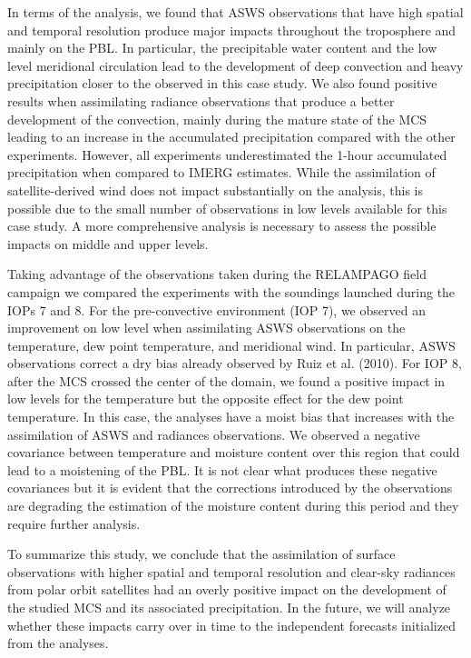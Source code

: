 \documentclass[final,5p,times,twocolumn,authoryear]{elsarticle} %
\begin{document}
In terms of the analysis, we found that ASWS observations that have high spatial and temporal resolution produce major impacts throughout the troposphere and mainly on the PBL. In particular, the precipitable water content and the low level meridional circulation lead to the development of deep convection and heavy precipitation closer to the observed in this case study. We also found positive results when assimilating radiance observations that produce a better development of the convection, mainly during the mature state of the MCS leading to an increase in the accumulated precipitation compared with the other experiments. However, all experiments underestimated the 1-hour accumulated precipitation when compared to IMERG estimates. While the assimilation of satellite-derived wind does not impact substantially on the analysis, this is possible due to the small number of observations in low levels available for this case study. A more comprehensive analysis is necessary to assess the possible impacts on middle and upper levels.

Taking advantage of the observations taken during the RELAMPAGO field campaign we compared the experiments with the soundings launched during the IOPs 7 and 8. For the pre-convective environment (IOP 7), we observed an improvement on low level when assimilating ASWS observations on the temperature, dew point temperature, and meridional wind. In particular, ASWS observations correct a dry bias already observed by Ruiz et al. (2010). For IOP 8, after the MCS crossed the center of the domain, we found a positive impact in low levels for the temperature but the opposite effect for the dew point temperature. In this case, the analyses have a moist bias that increases with the assimilation of ASWS and radiances observations. We observed a negative covariance between temperature and moisture content over this region that could lead to a moistening of the PBL. It is not clear what produces these negative covariances but it is evident that the corrections introduced by the observations are degrading the estimation of the moisture content during this period and they require further analysis.

To summarize this study, we conclude that the assimilation of surface observations with higher spatial and temporal resolution and clear-sky radiances from polar orbit satellites had an overly positive impact on the development of the studied MCS and its associated precipitation. In the future, we will analyze whether these impacts carry over in time to the independent forecasts initialized from the analyses.
\end{document}
